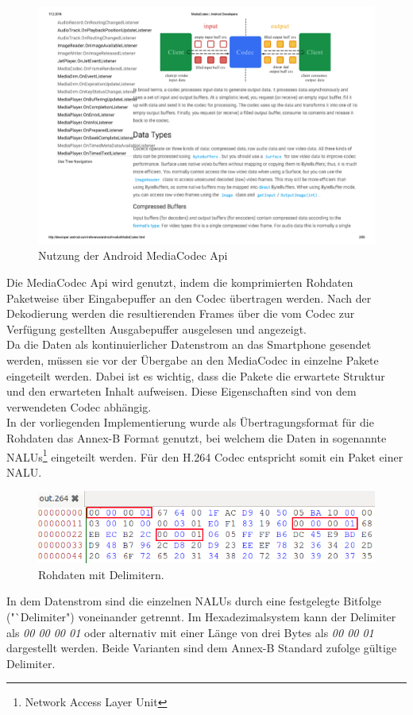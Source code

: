 \begin{figure}[h]
	\includegraphics{Bilder/BildakquiseUndDatenaufbereitung/mediacodec.pdf}
	\caption[Nutzung der Android MediaCdec Api]{Nutzung der Android MediaCodec Api\footnotemark}
	\label{fig:media_codec}
\end{figure}
Die MediaCodec Api wird genutzt, indem die komprimierten Rohdaten Paketweise über Eingabepuffer an den Codec übertragen werden. Nach der Dekodierung werden die resultierenden Frames über die vom Codec zur Verfügung gestellten Ausgabepuffer ausgelesen und angezeigt.\\
Da die Daten als kontinuierlicher Datenstrom an das Smartphone gesendet werden, müssen sie vor der Übergabe an den MediaCodec in einzelne Pakete eingeteilt werden. Dabei ist es wichtig, dass die Pakete die erwartete Struktur und den erwarteten Inhalt aufweisen. Diese Eigenschaften sind von dem verwendeten Codec abhängig.\\
 In der vorliegenden Implementierung wurde als Übertragungsformat für die Rohdaten das Annex-B Format genutzt, bei welchem die Daten in sogenannte NALUs\footnote{Network Access Layer Unit} eingeteilt werden. Für den H.264 Codec entspricht somit ein Paket einer NALU.\\
\begin{figure}[H]
	\includegraphics{Bilder/BildakquiseUndDatenaufbereitung/NALUs.png}
	\caption{Rohdaten mit Delimitern.}
	\label{fig:nalus_delimiter}
\end{figure}
In dem Datenstrom sind die einzelnen NALUs durch eine festgelegte Bitfolge ("`Delimiter") voneinander getrennt. Im Hexadezimalsystem kann der Delimiter als \textit{00 00 00 01} oder alternativ mit einer Länge von drei Bytes als \textit{00 00 01} dargestellt werden. Beide Varianten sind dem Annex-B Standard zufolge gültige Delimiter.\\

